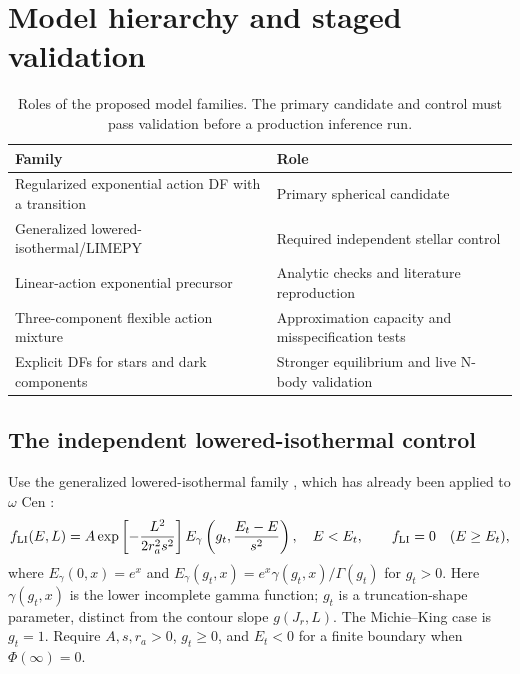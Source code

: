 \documentclass[11pt,a4paper]{article}
\begin{document}
\section{Model hierarchy and staged validation}
\label{sec:validation}

\begin{table}[htbp]
\centering\small
\caption{Roles of the proposed model families. The primary candidate and
control must pass validation before a production inference run.}
\begin{tabularx}{\linewidth}{p{.46\linewidth}X}
\toprule
Family & Role\\
\midrule
Regularized exponential action DF with a transition & Primary spherical candidate\\
Generalized lowered-isothermal/LIMEPY & Required independent stellar control\\
Linear-action exponential precursor & Analytic checks and literature reproduction\\
Three-component flexible action mixture & Approximation capacity and misspecification tests\\
Explicit DFs for stars and dark components & Stronger equilibrium and live N-body validation\\
\bottomrule
\end{tabularx}
\end{table}

\subsection{The independent lowered-isothermal control}



Use the generalized lowered-isothermal family
\citep{2015MNRAS.454..576G,2018MNRAS.474.3997G}, which has already been
applied to $\omega$ Cen \citep{2017MNRAS.468.4429Z,2019MNRAS.482.4713Z}:
\begin{equation}
 f_{\rm LI}(E,L)=A\exp\left[-\frac{L^2}{2r_a^2s^2}\right]
 E_\gamma\left(g_t,\frac{E_t-E}{s^2}\right),\quad E<E_t,
 \qquad f_{\rm LI}=0\quad(E\geq E_t),
 \label{eq:limepy}
\end{equation}
where $E_\gamma(0,x)=e^x$ and
$E_\gamma(g_t,x)=e^x\gamma(g_t,x)/\Gamma(g_t)$ for $g_t>0$.
Here $\gamma(g_t,x)$ is the lower incomplete gamma function; $g_t$ is a
truncation-shape parameter, distinct from the contour slope $g(J_r,L)$.
The Michie--King case is $g_t=1$. Require $A,s,r_a>0$, $g_t\geq0$, and
$E_t<0$ for a finite boundary when $\Phi(\infty)=0$.
\end{document}
